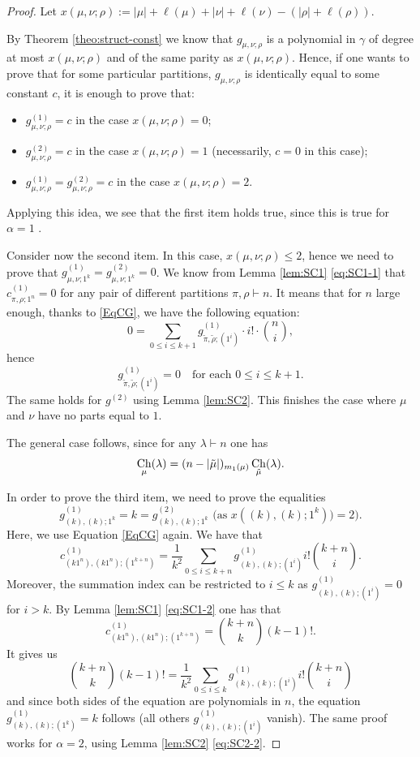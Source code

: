 \documentclass[11pt]{amsart}
\theoremstyle{plain}
\theoremstyle{remark}
\DeclareMathOperator{\Ch}{Ch}
\begin{document}
\begin{proof}
Let 
$x(\mu,\nu;\rho) :=  |\mu| + \ell(\mu) + |\nu| + \ell(\nu) -  (|\rho| + \ell(\rho))$.

By Theorem \ref{theo:struct-const} we know that $g_{\mu,\nu;\rho}$ is a polynomial in $\gamma$
of degree at most $x(\mu,\nu;\rho)$ and of the same parity as
$x(\mu,\nu;\rho)$.
Hence, if one wants to prove that for some particular partitions,
$g_{\mu,\nu;\rho}$ is identically equal to some constant $c$,
it is enough to prove that:
\begin{itemize}
\item $g^{(1)}_{\mu,\nu;\rho} = c$ in the case $x(\mu,\nu;\rho) = 0$;
\item $g^{(2)}_{\mu,\nu;\rho} = c$ in the case $x(\mu,\nu;\rho) = 1$
    (necessarily, $c=0$ in this case);
\item $g^{(1)}_{\mu,\nu;\rho} = g^{(2)}_{\mu,\nu;\rho} = c$ in the case $x(\mu,\nu;\rho) = 2$.
    \bigskip
\end{itemize}

Applying this idea, we see that
the first item holds true, since this is true for $\alpha = 1$
\cite[Proposition 4.9.]{IvanovOlshanski2002}.\bigskip

Consider now the second item.
In this case, $x(\mu,\nu;\rho) \le 2$, hence
we need to prove that $g^{(1)}_{\mu,\nu;1^k} = g^{(2)}_{\mu,\nu;1^k} = 0$.
We know from Lemma \ref{lem:SC1} \eqref{eq:SC1-1}
that $c^{(1)}_{\pi,\rho;1^n} = 0$ for any pair of different partitions $\pi, \rho \vdash n$.
It means that for $n$ large enough, thanks to \eqref{EqCG}, we have the following equation:
\[0 = \sum_{0 \leq i \leq k+1} g^{(1)}_{\tilde{\pi},\tilde{\rho}; (1^i)} \cdot i! \cdot \binom{n}{i},\]
hence \[ g^{(1)}_{\tilde{\pi},\tilde{\rho}; (1^i)} = 0 \quad \text{for each $0\leq i\leq k+1$.}\]
The same holds for $g^{(2)}$ using Lemma \ref{lem:SC2}.
This finishes the case where $\mu$ and $\nu$ have no parts equal to $1$.

The general case follows, since for any $\lambda \vdash n$ one has
\[ \Ch_\mu(\lambda) = (n-|\tilde{\mu}|)_{m_1(\mu)}\Ch_{\tilde{\mu}}(\lambda).\bigskip\]

In order to prove the third item,
we need to prove the equalities 
\[g^{(1)}_{(k),(k);1^k} = k = g^{(2)}_{(k),(k);1^k}
\text{ (as $x( (k),(k);1^k ))=2$)}.\]
Here, we use Equation \eqref{EqCG} again. We have that
\[ c^{(1)}_{(k 1^n),(k 1^n);(1^{k+n})} = \frac{1}{k^2} 
\sum_{0 \leq i \leq k+n} g^{(1)}_{(k),(k);(1^i)}    
i! \binom{k+n}{i}. \]
Moreover, the summation index can be restricted to $i \le k$
as $g^{(1)}_{(k),(k);(1^i)}=0$ for $i>k$.
By Lemma \ref{lem:SC1} \eqref{eq:SC1-2} one has that 
\[c^{(1)}_{(k 1^n),(k 1^n);(1^{k+n})} = \binom{k+n}{k} (k-1)!. \]
It gives us
\[ \binom{k+n}{k} (k-1)! = \frac{1}{k^2} 
\sum_{0 \leq i \leq k} g^{(1)}_{(k),(k);(1^i)}    
i! \binom{k+n}{i}\]
and since both sides of the equation are polynomials in $n$,
the equation $g^{(1)}_{(k),(k);(1^k)} = k$ follows
(all others $g^{(1)}_{(k),(k);(1^i)}$ vanish).
The same proof works for $\alpha=2$, using Lemma \ref{lem:SC2} \eqref{eq:SC2-2}.


\end{proof}
\end{document}
